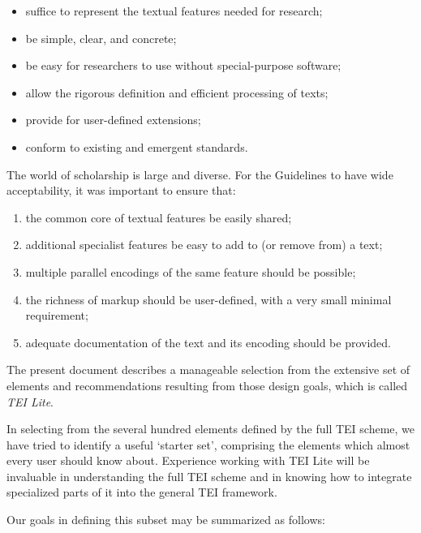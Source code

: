 \documentclass[11pt,twoside]{article}\makeatletter
\begin{document}
\begin{itemize}

\item suffice to represent the textual features needed for
       research;
\item be simple, clear, and concrete;
\item be easy for researchers to use without special-purpose
software;
\item allow the rigorous definition and efficient processing of
texts;
\item provide for user-defined extensions;
\item conform to existing and emergent standards.
\end{itemize} \par The world of scholarship is large and diverse. For the Guidelines
to have wide acceptability, it was important to ensure that:
\begin{enumerate}

\item the common core of textual features be easily shared;
\item additional specialist features be easy to add to (or remove
from) a text;
\item multiple parallel encodings of the same feature should be
possible;
\item the richness of markup should be user-defined, with a very
small minimal requirement;
\item adequate documentation of the text and its encoding should be
provided.
\end{enumerate}\par The present document describes a manageable selection from the
extensive set of elements and recommendations resulting from those
design goals, which is called \textit{TEI Lite}.\par In selecting from the  several hundred elements defined by
the full TEI scheme, we have tried to identify a useful ‘starter
set’, comprising the elements which almost every user should
know about.  Experience working with TEI Lite will be invaluable in
understanding the full TEI scheme and in knowing how to integrate
specialized parts of it into the general TEI framework.\par Our goals in defining this subset may be summarized as follows:
\end{document}
